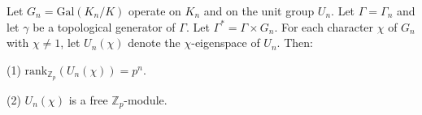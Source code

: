Let $G_n = \mathrm{Gal}(K_n/K)$ operate on $K_n$ and on the unit group $U_n$. Let $\Gamma = \Gamma_n$ and let $\gamma$ be a topological generator of $\Gamma$. Let $\Gamma^* = \Gamma \times G_n$. For each character $\chi$ of $G_n$ with $\chi \neq 1$, let $U_n(\chi)$ denote the $\chi$-eigenspace of $U_n$. Then:

(1) $\mathrm{rank}_{\mathbb{Z}_p}(U_n(\chi)) = p^n$.

(2) $U_n(\chi)$ is a free $\mathbb{Z}_p$-module.
